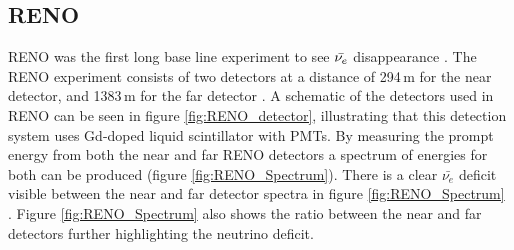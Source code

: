 \subsection{RENO} \label{subSec:reno}
RENO was the first long base line experiment to see $\Bar{\nu_e}$ disappearance \cite{Olive_2014}. The RENO experiment consists of two detectors at a distance of 294\,m for the near detector, and 1383\,m for the far detector \cite{reno_may_2012}. A schematic of the detectors used in RENO can be seen in figure \ref{fig:RENO_detector}, illustrating that this detection system uses Gd-doped liquid scintillator with PMTs. By measuring the prompt energy from both the near and far RENO detectors a spectrum of energies for both can be produced (figure \ref{fig:RENO_Spectrum}). There is a clear $\bar{\nu_e}$ deficit visible between the near and far detector spectra in figure \ref{fig:RENO_Spectrum} \cite{reno_may_2012}. Figure \ref{fig:RENO_Spectrum} also shows the ratio between the near and far detectors further highlighting the neutrino deficit. 

